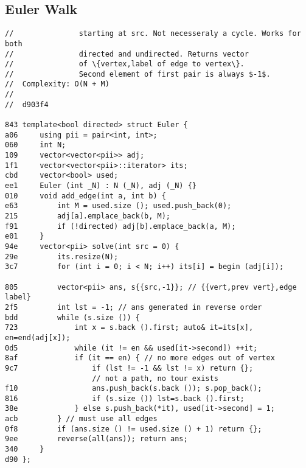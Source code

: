 \documentclass[11pt, a4paper, twoside]{article}
\begin{document}
\subsection{ Euler Walk}
\begin{lstlisting}
//               starting at src. Not necesseraly a cycle. Works for both 
//               directed and undirected. Returns vector 
//               of \{vertex,label of edge to vertex\}.
//               Second element of first pair is always $-1$.
//  Complexity: O(N + M)
//
//  d903f4

843 template<bool directed> struct Euler {
a06     using pii = pair<int, int>;
060     int N;
109     vector<vector<pii>> adj; 
1f1     vector<vector<pii>::iterator> its; 
cbd     vector<bool> used;
ee1     Euler (int _N) : N (_N), adj (_N) {}
010     void add_edge(int a, int b) {
e63         int M = used.size (); used.push_back(0); 
215         adj[a].emplace_back(b, M); 
f91         if (!directed) adj[b].emplace_back(a, M);
e01     }
94e     vector<pii> solve(int src = 0) { 
29e         its.resize(N);
3c7         for (int i = 0; i < N; i++) its[i] = begin (adj[i]);
    
805         vector<pii> ans, s{{src,-1}}; // {{vert,prev vert},edge label}
2f5         int lst = -1; // ans generated in reverse order
bdd         while (s.size ()) { 
723             int x = s.back ().first; auto& it=its[x], en=end(adj[x]);
0d5             while (it != en && used[it->second]) ++it;
8af             if (it == en) { // no more edges out of vertex
9c7                 if (lst != -1 && lst != x) return {};
                    // not a path, no tour exists
f10                 ans.push_back(s.back ()); s.pop_back(); 
816                 if (s.size ()) lst=s.back ().first;
38e             } else s.push_back(*it), used[it->second] = 1;
acb         } // must use all edges
0f8         if (ans.size () != used.size () + 1) return {}; 
9ee         reverse(all(ans)); return ans;
340     }
d90 };
\end{lstlisting}
\end{document}
